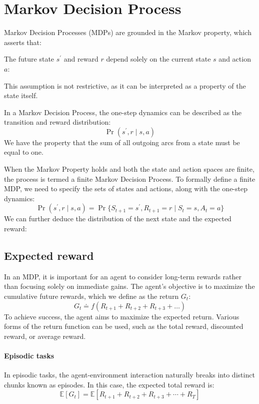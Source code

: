 \section{Markov Decision Process}

Markov Decision Processes (MDPs) are grounded in the Markov property, which asserts that:
\begin{property}
    The future state $s^\prime$ and reward $r$ depend solely on the current state $s$ and action $a$: 
\end{property}
This assumption is not restrictive, as it can be interpreted as a property of the state itself.

In a Markov Decision Process, the one-step dynamics can be described as the transition and reward distribution:
\[\Pr(s^\prime,r\mid s,a)\]
We have the property that the sum of all outgoing arcs from a state must be equal to one. 

When the Markov Property holds and both the state and action spaces are finite, the process is termed a finite Markov Decision Process.
To formally define a finite MDP, we need to specify the sets of states and actions, along with the one-step dynamics:
\[\Pr(s^\prime, r \mid s, a) = \Pr\{S_{t+1}=s^\prime, R_{t+1}=r \mid S_t=s, A_t=a\}\]
We can further deduce the distribution of the next state and the expected reward: 

\subsection{Expected reward}
In an MDP, it is important for an agent to consider long-term rewards rather than focusing solely on immediate gains. 
The agent's objective is to maximize the cumulative future rewards, which we define as the return $G_t$:
\[G_t \doteq f\left(R_{t+1}+R_{t+2}+R_{t+3}+\dots\right)\]
To achieve success, the agent aims to maximize the expected return. 
Various forms of the return function can be used, such as the total reward, discounted reward, or average reward.

\paragraph*{Episodic tasks}
In episodic tasks, the agent-environment interaction naturally breaks into distinct chunks known as episodes. 
In this case, the expected total reward is:
\[\mathbb{E}\left[G_t\right]=\mathbb{E}\left[R_{t+1}+R_{t+2}+R_{t+3}+\cdots+R_T\right]\]

